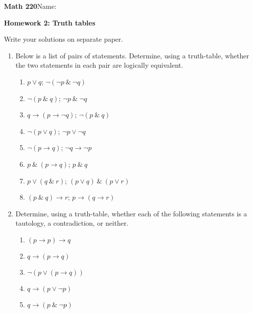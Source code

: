 \documentclass{article}
\begin{document}
{\bf Math 220}\hfill{Name:}

{\bf Homework 2: Truth tables}
\vspace{.3in}

Write your solutions on separate paper.

\begin{enumerate}
\item  Below is a list of pairs of statements. Determine, using a truth-table, 
whether the 
two statements in each pair are logically equivalent.

\begin{enumerate}
\item $p\vee q$; $\neg (\neg p \ \&\ \neg q)$

\item $\neg (p\ \&\ q)$; $\neg p\ \&\ \neg q$

\item $q\rightarrow (p\rightarrow \neg q)$; $\neg(p\ \&\ q)$

\item $\neg(p\vee q)$; $\neg p \vee \neg q$

\item $\neg (p\rightarrow q)$; $\neg q\rightarrow \neg p$

\item $p\ \&\ (p\rightarrow q)$; $p\ \&\ q$

\item $p\vee (q\ \&\ r)$; $(p\vee q)\ \&\ (p\vee r)$

\item $(p\ \&\ q)\rightarrow r$; $p\rightarrow (q\rightarrow r)$

\bigskip
\end{enumerate}
\item Determine, using a truth-table, whether each of the following statements 
is a tautology, a contradiction, or neither.

\begin{enumerate}
\item $(p\rightarrow p)\rightarrow q$

\item $q\rightarrow (p\rightarrow q)$

\item $\neg ( p\vee (p\rightarrow q))$

\item $q\rightarrow (p \vee \neg p)$

\item $q\rightarrow (p\ \&\ \neg p)$


\end{enumerate}
\end{enumerate}
\end{document}
